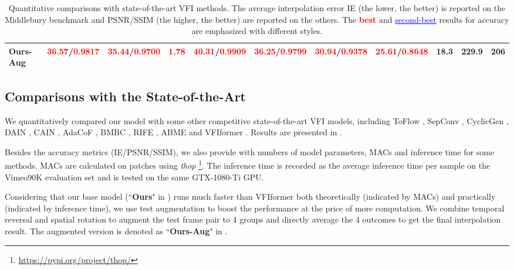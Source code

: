 \documentclass{article}
\begin{document}
\begin{table*}[hbtp]
{\begin{tabular}{lcccccccccc}
            \textbf{Ours-Aug} & \textcolor{red}{\textbf{36.57}}/\textcolor{red}{\textbf{0.9817}} & \textcolor{red}{\textbf{35.44}}/\textcolor{red}{\textbf{0.9700}} & \textcolor{red}{\textbf{1.78}} & \textcolor{red}{\textbf{40.31}}/\textcolor{red}{\textbf{0.9909}} & \textcolor{red}{\textbf{36.25}}/\textcolor{red}{\textbf{0.9799}} & \textcolor{red}{\textbf{30.94}}/\textcolor{red}{\textbf{0.9378}} & \textcolor{red}{\textbf{25.61}}/\textcolor{red}{\textbf{0.8648}} & 18.3 & 229.9 & 206\\
            
    
            \bottomrule
        \end{tabular}
    }
     \caption{Quantitative comparisons with state-of-the-art VFI methods. The average interpolation error IE (the lower, the better) is reported on the Middlebury benchmark and PSNR/SSIM (the higher, the better) are reported on the others. The \textcolor{red}{\textbf{best}} and \textcolor{blue}{\underline{second-best}} results for accuracy are emphasized with different styles.}
    \label{tab:sota}
\end{table*}

 \subsection{Comparisons with the State-of-the-Art}

We quantitatively compared our model with some other competitive state-of-the-art VFI models, including ToFlow \cite{toflow}, SepConv \cite{ada_sep_conv}, CyclicGen \cite{liu2019deep}, DAIN \cite{dain}, CAIN \cite{cain}, AdaCoF \cite{adacof}, BMBC \cite{bmbc}, RIFE \cite{rife}, ABME \cite{abme} and VFIformer \cite{vfiformer}. Results are presented in .

Besides the accuracy metrics (IE/PSNR/SSIM), we also provide  with numbers of model parameters, MACs and inference time for some methods. MACs are calculated on  patches using \textit{thop} \footnote{\url{https://pypi.org/project/thop/}}. The inference time is recorded as the average inference time per sample on the Vimeo90K evaluation set and is tested on the same GTX-1080-Ti GPU.

Considering that our base model (``\textbf{Ours}" in ) runs much faster than VFIformer both theoretically (indicated by MACs) and practically (indicated by inference time), we use test augmentation to boost the performance at the price of more computation. We combine temporal reversal and  spatial rotation to augment the test frame pair to 4 groups and directly average the 4 outcomes to get the final interpolation result. The augmented version is denoted as ``\textbf{Ours-Aug}" in .
\end{document}
